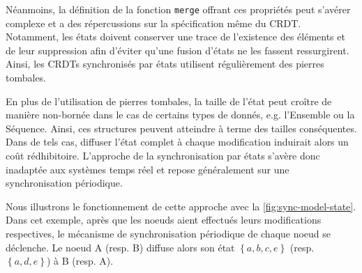 \documentclass[12pt]{thesul}
\newcommand{\eg}{e.g. }
\newcommand{\set}[1]{\left\{#1\right\}} %
\begin{document}
Néanmoins, la définition de la fonction \texttt{merge} offrant ces propriétés peut s'avérer complexe et a des répercussions sur la spécification même du \ac{CRDT}.
Notamment, les états doivent conserver une trace de l'existence des éléments et de leur suppression afin d'éviter qu'une fusion d'états ne les fassent ressurgirent.
Ainsi, les \acp{CRDT} synchronisés par états utilisent régulièrement des pierres tombales.

En plus de l'utilisation de pierres tombales, la taille de l'état peut croître de manière non-bornée dans le cas de certains types de donnés, \eg l'Ensemble ou la Séquence.
Ainsi, ces structures peuvent atteindre à terme des tailles conséquentes.
Dans de tels cas, diffuser l'état complet à chaque modification induirait alors un coût rédhibitoire.
L'approche de la synchronisation par états s'avère donc inadaptée aux systèmes temps réel et repose généralement sur une synchronisation périodique.

Nous illustrons le fonctionnement de cette approche avec la \autoref{fig:sync-model-state}.
Dans cet exemple, après que les noeuds aient effectués leurs modifications respectives, le mécanisme de synchronisation périodique de chaque noeud se déclenche.
Le noeud A (resp. B) diffuse alors son état $\set{a,b,c,e}$ (resp. $\set{a,d,e}$) à B (resp. A).
\end{document}
